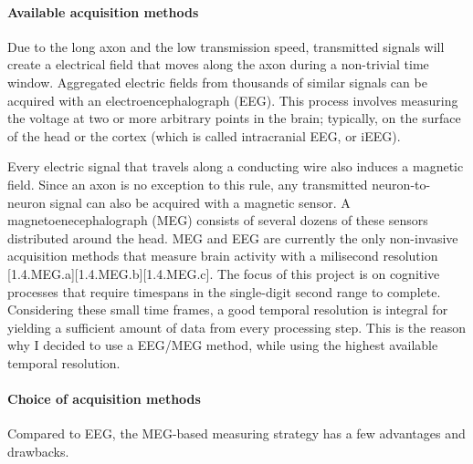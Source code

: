 \paragraph {Available acquisition methods}
Due to the long axon and the low transmission speed, transmitted signals will create a electrical field that moves along the axon during a non-trivial time window.
Aggregated electric fields from thousands of similar signals can be acquired with an electroencephalograph (EEG).
This process involves measuring the voltage at two or more arbitrary points in the brain; typically, on the surface of the head or the cortex (which is called intracranial EEG, or iEEG).

Every electric signal that travels along a conducting wire also induces a magnetic field.
Since an axon is no exception to this rule, any transmitted neuron-to-neuron signal can also be acquired with a magnetic sensor.
A magnetoenecephalograph (MEG) consists of several dozens of these sensors distributed around the head.
MEG and EEG are currently the only non-invasive acquisition methods that measure brain activity with a milisecond resolution [1.4.MEG.a][1.4.MEG.b][1.4.MEG.c].
The focus of this project is on cognitive processes that require timespans in the single-digit second range to complete.
Considering these small time frames, a good temporal resolution is integral for yielding a sufficient amount of data from every processing step.
This is the reason why I decided to use a EEG/MEG method, while using the highest available temporal resolution.

\paragraph{Choice of acquisition methods}
Compared to EEG, the MEG-based measuring strategy has a few advantages and drawbacks.

